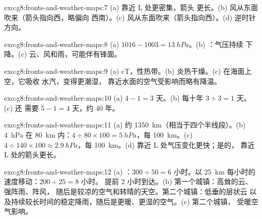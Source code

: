 \begin{solution}{exo:g8:fronts-and-weather-maps:7}
(a) 靠近 L 处更密集，箭头
更长。(b) 风从东面吹来（箭头指向西，略偏向
西南）。(c) 风从东面吹来（箭头指向西）。(d)
逆时针方向。
\end{solution}

\begin{solution}{exo:g8:fronts-and-weather-maps:8}
(a) $1016 - 1003 = \qty{13}{hPa}$。(b) ：气压持续
下降。(c) 云、风和雨，可能伴有锋面。
\end{solution}

\begin{solution}{exo:g8:fronts-and-weather-maps:9}
(a) cT，性热带。(b) 炎热干燥。(c) 在海面上空，它吸收
水汽，变得更潮湿，
靠近水面的空气受影响而略有降温。
\end{solution}

\begin{solution}{exo:g8:fronts-and-weather-maps:10}
(a) $4 - 1 = 3$ 天。(b) 每十年 $3 \div 3 = 1$ 天。(c) 还
需要 $5 - 1 = 4$ 天，约 40 年。
\end{solution}

\begin{solution}{exo:g8:fronts-and-weather-maps:11}
(a) 约 \qty{1350}{km}（相当于四个半线段）。(b) \qty{4}{hPa}
在 \qty{80}{km} 内：$4 \div 80 \times 100 = \qty{5}{hPa}$，每
\qty{100}{km}。(c) $4 \div 140 \times 100 \approx \qty{2.9}{hPa}$，每
\qty{100}{km}。(d) 靠近 L 处气压变化更快；是的，
靠近 L 处的箭头更长。
\end{solution}

\begin{solution}{exo:g8:fronts-and-weather-maps:12}
(a) ：$300 \div 50 = 6$ 小时。以
\qty{25}{km} 每小时的速度移动：$200 \div 25 = 8$ 小时。
提前 2 小时到达。(b) 第一个城镇：高耸的云、强阵雨、阵风，
随后是较凉的空气和转晴的天空。第二个城镇：低垂的层状云
以及持续较长时间的稳定降雨，随后是更暖、更湿的空气。(c) 第二个城镇，
受暖空气影响。
\end{solution}

